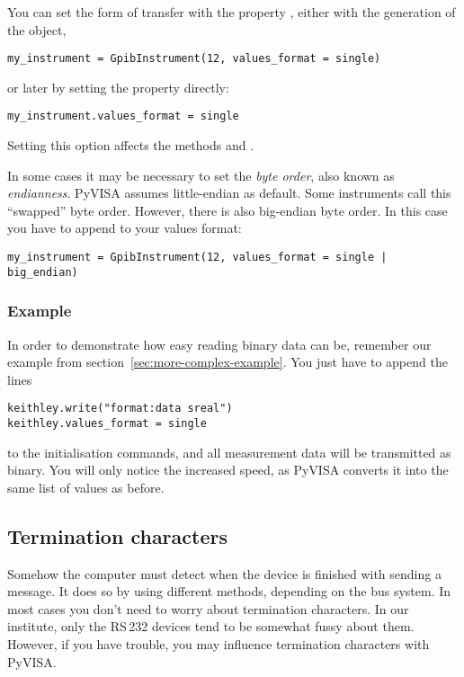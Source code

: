 \documentclass{howto}
\begin{document}
You can set the form of transfer with the property , either
with the generation of the object,
\begin{verbatim}
my_instrument = GpibInstrument(12, values_format = single)
\end{verbatim}
or later by setting the property directly:
\begin{verbatim}
my_instrument.values_format = single
\end{verbatim}
Setting this option affects the methods  and
.

In some cases it may be necessary to set the \emph{byte order}, also known as
\emph{endianness}.  PyVISA assumes little-endian as default.  Some instruments
call this ``swapped'' byte order.  However, there is also big-endian byte
order.  In this case you have to append  to your values
format:
\begin{verbatim}
my_instrument = GpibInstrument(12, values_format = single | big_endian)
\end{verbatim}


\subsubsection{Example}
\label{sec:binary-example}

In order to demonstrate how easy reading binary data can be, remember our
example from section~\ref{sec:more-complex-example}.  You just have to append
the lines
\begin{verbatim}
keithley.write("format:data sreal")
keithley.values_format = single
\end{verbatim}
to the initialisation commands, and all measurement data will be transmitted as
binary.  You will only notice the increased speed, as PyVISA converts it into
the same list of values as before.


\subsection{Termination characters}
\label{sec:termchars}

Somehow the computer must detect when the device is finished with sending a
message.  It does so by using different methods, depending on the bus system.
In most cases you don't need to worry about termination characters.  In our
institute, only the RS\,232 devices tend to be somewhat fussy about them.
However, if you have trouble, you may influence termination characters with
PyVISA\@.
\end{document}
